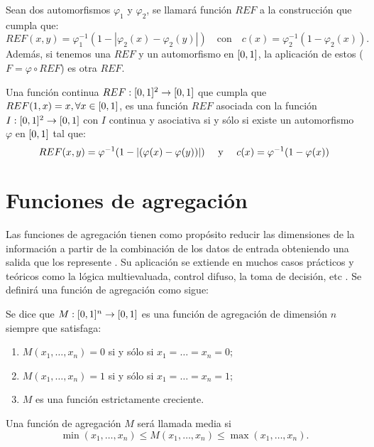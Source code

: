 \begin{proposition}\label{prop:contruccionref}
Sean dos automorfismos $\varphi_{1}$ y $\varphi_{2}$, se llamará función $REF$ a la construcción que cumpla que: 
$$REF(x,y) = \varphi_1^{-1}(1-|\varphi_2(x)-\varphi_2(y)|) \quad\text{con}\quad c(x) = \varphi_2^{-1}(1-\varphi_2(x)).$$ 
Además, si tenemos una $REF$ y un automorfismo en $[0,1]$, la aplicación de estos ($F=\varphi \circ REF$) es otra $REF$.
\end{proposition}

\begin{theorem}\label{th:ref}
Una función continua $REF:[0,1]^2 \rightarrow[0,1]$ que cumpla que $REF(1,x)=x, \forall x\in[0,1]$, es una función $REF$ asociada con la función $I:[0,1]^2\rightarrow[0,1]$ con $I$ continua y asociativa si y sólo si existe un automorfismo $\varphi$ en $[0,1]$ tal que:
$$REF(x,y)=\varphi^{-1}(1-\left\vert(\varphi(x)-\varphi(y))\right\vert)\quad\text{ y }\quad c(x)=\varphi^{-1}(1-\varphi(x))$$
\end{theorem}



\section{Funciones de agregación}\label{sec:agregacion}
Las funciones de agregación tienen como propósito reducir las dimensiones de la información a partir de la combinación de los datos de entrada obteniendo una salida que los represente \cite{art:montero, art:calvoagregacion}. Su aplicación se extiende en muchos casos prácticos y teóricos como la lógica multievaluada, control difuso, la toma de decisión, etc \cite{art:paternain}.  Se definirá una función de agregación como sigue:

\begin{definition}\label{def:agregacion}
Se dice que $M : [0,1]^n \rightarrow [0,1]$ es una función de agregación de dimensión $n$ siempre que satisfaga:
	\begin{enumerate}
	\item $M(x_1, \dots, x_n) = 0$ si y sólo si $x_1=\dots=x_n=0$;
	\item $M(x_1, \dots, x_n) = 1$ si y sólo si $x_1=\dots=x_n=1$;
	\item $M$ es una función estrictamente creciente.
	\end{enumerate}
\end{definition}
\begin{definition}
Una función de agregación $M$ será llamada media si
$$ \min(x_{1}, \dots, x_{n})  \leq M(x_{1}, \dots, x_{n}) \leq \max(x_{1}, \dots, x_{n}).$$
\end{definition}

